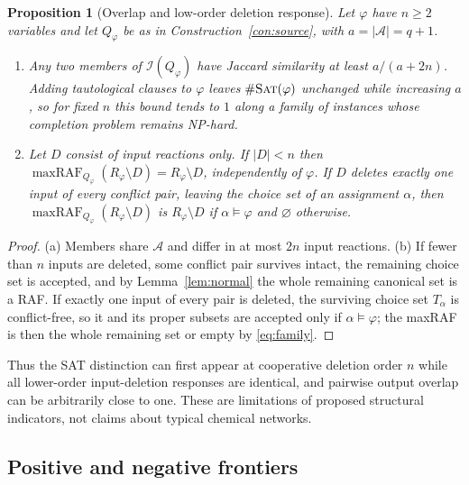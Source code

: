 \documentclass[11pt,a4paper]{article}
\theoremstyle{plain}
\newtheorem{proposition}[theorem]{Proposition}
\theoremstyle{definition}
\theoremstyle{remark}
\newcommand{\Irr}{\mathcal I}
\newcommand{\maxRAF}{\operatorname{maxRAF}}
\newcommand{\SAT}{\textup{\textsc{Sat}}}
\newcommand{\cA}{\mathcal A}
\begin{document}
\begin{proposition}[Overlap and low-order deletion response]\label{prop:indicators}
Let $\varphi$ have $n\ge2$ variables and let $Q_\varphi$ be as in Construction~\ref{con:source}, with $a=|\cA|=q+1$.
\begin{enumerate}[label=\textup{(\alph*)}]
\item Any two members of $\Irr(Q_\varphi)$ have Jaccard similarity at least $a/(a+2n)$. Adding tautological clauses to $\varphi$ leaves $\#\SAT(\varphi)$ unchanged while increasing $a$, so for fixed $n$ this bound tends to $1$ along a family of instances whose completion problem remains NP-hard.
\item Let $D$ consist of input reactions only. If $|D|<n$ then $\maxRAF_{Q_\varphi}(R_\varphi\setminus D)=R_\varphi\setminus D$, independently of $\varphi$. If $D$ deletes exactly one input of every conflict pair, leaving the choice set of an assignment $\alpha$, then $\maxRAF_{Q_\varphi}(R_\varphi\setminus D)$ is $R_\varphi\setminus D$ if $\alpha\models\varphi$ and $\varnothing$ otherwise.
\end{enumerate}
\end{proposition}
\begin{proof}
(a) Members share $\cA$ and differ in at most $2n$ input reactions. (b) If fewer than $n$ inputs are deleted, some conflict pair survives intact, the remaining choice set is accepted, and by Lemma~\ref{lem:normal} the whole remaining canonical set is a RAF. If exactly one input of every pair is deleted, the surviving choice set $T_\alpha$ is conflict-free, so it and its proper subsets are accepted only if $\alpha\models\varphi$; the maxRAF is then the whole remaining set or empty by \eqref{eq:family}.
\end{proof}

Thus the SAT distinction can first appear at cooperative deletion order $n$ while all lower-order input-deletion responses are identical, and pairwise output overlap can be arbitrarily close to one. These are limitations of proposed structural indicators, not claims about typical chemical networks.

\subsection{Positive and negative frontiers}\label{sec:frontier}
\end{document}

